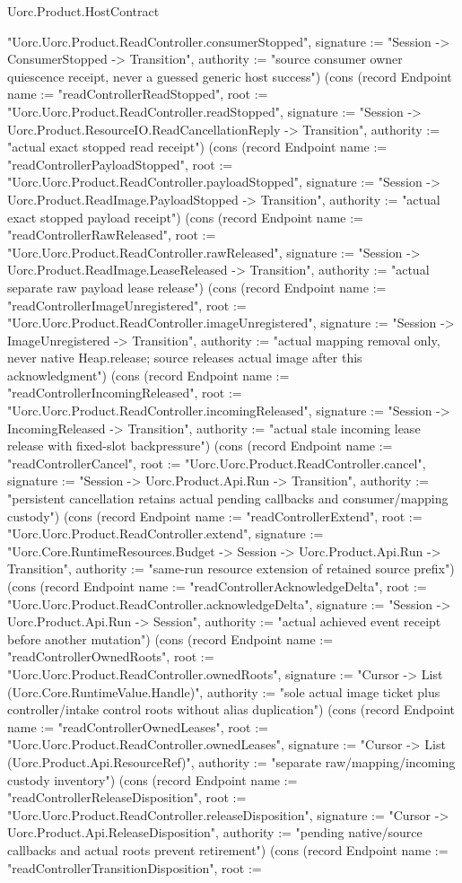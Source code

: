 \begin{lexlean}{Uorc.Product.HostContract}
\begin{semanticmodule}
{"Uorc.Uorc.Product.ReadController.consumerStopped", signature := "Session -> ConsumerStopped -> Transition", authority := "source consumer owner quiescence receipt, never a guessed generic host success"}) (cons (record Endpoint {name := "readControllerReadStopped", root := "Uorc.Uorc.Product.ReadController.readStopped", signature := "Session -> Uorc.Product.ResourceIO.ReadCancellationReply -> Transition", authority := "actual exact stopped read receipt"}) (cons (record Endpoint {name := "readControllerPayloadStopped", root := "Uorc.Uorc.Product.ReadController.payloadStopped", signature := "Session -> Uorc.Product.ReadImage.PayloadStopped -> Transition", authority := "actual exact stopped payload receipt"}) (cons (record Endpoint {name := "readControllerRawReleased", root := "Uorc.Uorc.Product.ReadController.rawReleased", signature := "Session -> Uorc.Product.ReadImage.LeaseReleased -> Transition", authority := "actual separate raw payload lease release"}) (cons (record Endpoint {name := "readControllerImageUnregistered", root := "Uorc.Uorc.Product.ReadController.imageUnregistered", signature := "Session -> ImageUnregistered -> Transition", authority := "actual mapping removal only, never native Heap.release; source releases actual image after this acknowledgment"}) (cons (record Endpoint {name := "readControllerIncomingReleased", root := "Uorc.Uorc.Product.ReadController.incomingReleased", signature := "Session -> IncomingReleased -> Transition", authority := "actual stale incoming lease release with fixed-slot backpressure"}) (cons (record Endpoint {name := "readControllerCancel", root := "Uorc.Uorc.Product.ReadController.cancel", signature := "Session -> Uorc.Product.Api.Run -> Transition", authority := "persistent cancellation retains actual pending callbacks and consumer/mapping custody"}) (cons (record Endpoint {name := "readControllerExtend", root := "Uorc.Uorc.Product.ReadController.extend", signature := "Uorc.Core.RuntimeResources.Budget -> Session -> Uorc.Product.Api.Run -> Transition", authority := "same-run resource extension of retained source prefix"}) (cons (record Endpoint {name := "readControllerAcknowledgeDelta", root := "Uorc.Uorc.Product.ReadController.acknowledgeDelta", signature := "Session -> Uorc.Product.Api.Run -> Session", authority := "actual achieved event receipt before another mutation"}) (cons (record Endpoint {name := "readControllerOwnedRoots", root := "Uorc.Uorc.Product.ReadController.ownedRoots", signature := "Cursor -> List (Uorc.Core.RuntimeValue.Handle)", authority := "sole actual image ticket plus controller/intake control roots without alias duplication"}) (cons (record Endpoint {name := "readControllerOwnedLeases", root := "Uorc.Uorc.Product.ReadController.ownedLeases", signature := "Cursor -> List (Uorc.Product.Api.ResourceRef)", authority := "separate raw/mapping/incoming custody inventory"}) (cons (record Endpoint {name := "readControllerReleaseDisposition", root := "Uorc.Uorc.Product.ReadController.releaseDisposition", signature := "Cursor -> Uorc.Product.Api.ReleaseDisposition", authority := "pending native/source callbacks and actual roots prevent retirement"}) (cons (record Endpoint {name := "readControllerTransitionDisposition", root := }
\end{semanticmodule}
\end{lexlean}
